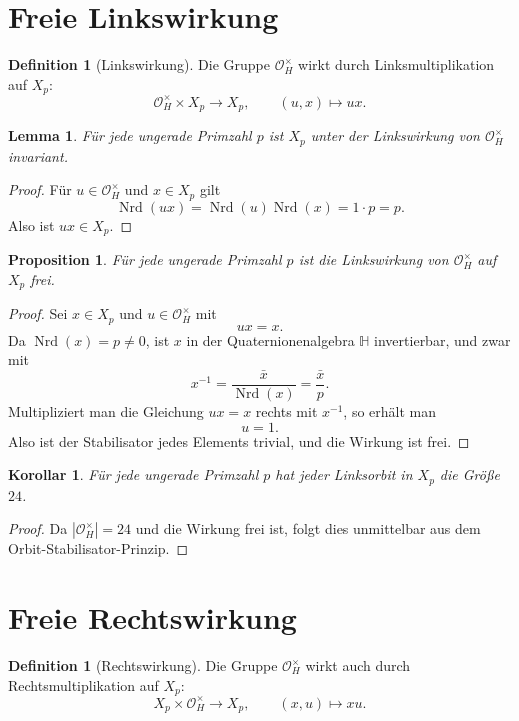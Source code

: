 \documentclass[12pt,a4paper]{article}
\theoremstyle{plain}
\newtheorem{lemma}[satz]{Lemma}
\newtheorem{proposition}[satz]{Proposition}
\newtheorem{korollar}[satz]{Korollar}
\theoremstyle{definition}
\newtheorem{definition}[satz]{Definition}
\theoremstyle{remark}
\newcommand{\OH}{\mathcal O_H}
\newcommand{\QH}{\mathbb H}
\newcommand{\nrd}{\operatorname{Nrd}}
\begin{document}
	\section{Freie Linkswirkung}
	
	\begin{definition}[Linkswirkung]
		Die Gruppe \(\OH^\times\) wirkt durch Linksmultiplikation auf \(X_p\):
		\[
		\OH^\times\times X_p\to X_p,\qquad (u,x)\mapsto ux.
		\]
	\end{definition}
	
	\begin{lemma}
		Für jede ungerade Primzahl \(p\) ist \(X_p\) unter der Linkswirkung von \(\OH^\times\) invariant.
	\end{lemma}
	
	\begin{proof}
		Für \(u\in\OH^\times\) und \(x\in X_p\) gilt
		\[
		\nrd(ux)=\nrd(u)\nrd(x)=1\cdot p=p.
		\]
		Also ist \(ux\in X_p\).
	\end{proof}
	
	\begin{proposition}
		Für jede ungerade Primzahl \(p\) ist die Linkswirkung von \(\OH^\times\) auf \(X_p\) frei.
	\end{proposition}
	
	\begin{proof}
		Sei \(x\in X_p\) und \(u\in\OH^\times\) mit
		\[
		ux=x.
		\]
		Da \(\nrd(x)=p\neq0\), ist \(x\) in der Quaternionenalgebra \(\QH\) invertierbar, und zwar mit
		\[
		x^{-1}=\frac{\bar x}{\nrd(x)}=\frac{\bar x}{p}.
		\]
		Multipliziert man die Gleichung \(ux=x\) rechts mit \(x^{-1}\), so erhält man
		\[
		u=1.
		\]
		Also ist der Stabilisator jedes Elements trivial, und die Wirkung ist frei.
	\end{proof}
	
	\begin{korollar}
		Für jede ungerade Primzahl \(p\) hat jeder Linksorbit in \(X_p\) die Größe \(24\).
	\end{korollar}
	
	\begin{proof}
		Da \(|\OH^\times|=24\) und die Wirkung frei ist, folgt dies unmittelbar aus dem Orbit-Stabilisator-Prinzip.
	\end{proof}
	
	\section{Freie Rechtswirkung}
	
	\begin{definition}[Rechtswirkung]
		Die Gruppe \(\OH^\times\) wirkt auch durch Rechtsmultiplikation auf \(X_p\):
		\[
		X_p\times\OH^\times\to X_p,\qquad (x,u)\mapsto xu.
		\]
	\end{definition}
	
\end{document}
